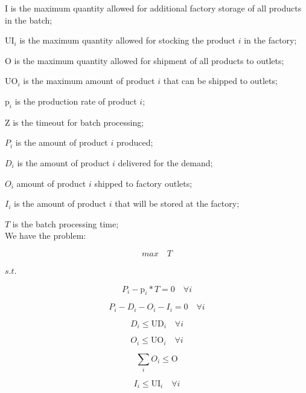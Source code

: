 \documentclass[10pt,fleqn,a4paper,twoside]{article}
\begin{document}
$\textrm{I}$ is the maximum quantity allowed for additional factory storage of all products in the batch;

$\textrm{UI}_i$ is the maximum quantity allowed for stocking the product $i$ in the factory;

$\textrm{O}$ is the maximum quantity allowed for shipment of all products to outlets;

$\textrm{UO}_i$ is the maximum amount of product $i$ that can be shipped to outlets;

$\textrm{p}_i$ is the production rate of product $i$;

$\textrm{Z}$ is the timeout for batch processing;

$P_i$ is the amount of product $i$ produced;

$D_i$ is the amount of product $i$ delivered for the demand;

$O_i$ amount of product $i$ shipped to factory outlets;

$I_i$ is the amount of product $i$ that will be stored at the factory;

$T$ is the batch processing time; \\

We have the problem:

\begin{equation}
\label{MBPTMP01}
max \quad T
\end{equation}

$s.t.$

\begin{equation}
P_i - \textrm{p}_i * T  = 0 \quad \forall i
\end{equation}

\begin{equation}
P_i - D_i - O_i - I_i = 0 \quad \forall i
\end{equation}

\begin{equation}
\label{MBPTMP04}
D_i \leq \textrm{UD}_i \quad \forall i
\end{equation}

\begin{equation}
O_i \leq \textrm{UO}_i \quad \forall i
\end{equation}

\begin{equation}
\sum_i{O_i} \leq \textrm{O}
\end{equation}

\begin{equation}
I_i \leq \textrm{UI}_i \quad \forall i
\end{equation}
\end{document}
